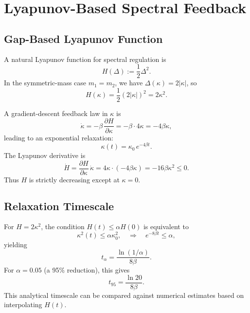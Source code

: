 \documentclass[11pt]{article}
\begin{document}
\section{Lyapunov-Based Spectral Feedback}

\subsection{Gap-Based Lyapunov Function}

A natural Lyapunov function for spectral regulation is
\begin{equation}
  H(\Delta) := \frac{1}{2}\Delta^2.
\end{equation}
In the symmetric-mass case $m_1 = m_2$, we have $\Delta(\kappa) = 2|\kappa|$, so
\begin{equation}
  H(\kappa) = \frac{1}{2}(2|\kappa|)^2 = 2\kappa^2.
\end{equation}

A gradient-descent feedback law in $\kappa$ is
\begin{equation}
  \dot\kappa = -\beta\,\frac{\partial H}{\partial \kappa}
  = -\beta \cdot 4\kappa = -4\beta\kappa,
\end{equation}
leading to an exponential relaxation:
\begin{equation}
  \kappa(t) = \kappa_0\,e^{-4\beta t}.
\end{equation}
The Lyapunov derivative is
\begin{equation}
  \dot H = \frac{\partial H}{\partial \kappa}\,\dot\kappa
  = 4\kappa \cdot (-4\beta\kappa)
  = -16\beta\kappa^2 \le 0.
\end{equation}
Thus $H$ is strictly decreasing except at $\kappa=0$.

\subsection{Relaxation Timescale}

For $H = 2\kappa^2$, the condition $H(t) \le \alpha H(0)$ is equivalent to
\begin{equation}
  \kappa^2(t) \le \alpha \kappa_0^2,
  \quad \Rightarrow\quad
  e^{-8\beta t} \le \alpha,
\end{equation}
yielding
\begin{equation}
  t_\alpha = \frac{\ln(1/\alpha)}{8\beta}.
\end{equation}
For $\alpha = 0.05$ (a 95\% reduction), this gives
\begin{equation}
  t_{95}
  = \frac{\ln 20}{8\beta}.
\end{equation}
This analytical timescale can be compared against numerical estimates based on interpolating $H(t)$.
\end{document}
